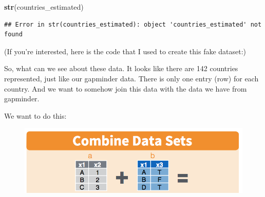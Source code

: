 \documentclass[]{book}
\newenvironment{Shaded}{\begin{snugshade}}{\end{snugshade}}
\newcommand{\KeywordTok}[1]{\textcolor[rgb]{0.13,0.29,0.53}{\textbf{#1}}}
\newcommand{\DataTypeTok}[1]{\textcolor[rgb]{0.13,0.29,0.53}{#1}}
\newcommand{\DecValTok}[1]{\textcolor[rgb]{0.00,0.00,0.81}{#1}}
\newcommand{\StringTok}[1]{\textcolor[rgb]{0.31,0.60,0.02}{#1}}
\newcommand{\OperatorTok}[1]{\textcolor[rgb]{0.81,0.36,0.00}{\textbf{#1}}}
\newcommand{\NormalTok}[1]{#1}
\theoremstyle{definition}
\theoremstyle{definition}
\theoremstyle{definition}
\theoremstyle{remark}
\begin{document}
\begin{Shaded}
\begin{Highlighting}[]
\KeywordTok{str}\NormalTok{(countries_estimated)}
\end{Highlighting}
\end{Shaded}

\begin{verbatim}
## Error in str(countries_estimated): object 'countries_estimated' not found
\end{verbatim}

(If you're interested, here is the code that I used to create this fake
dataset:)

\begin{Shaded}
\end{Shaded}

So, what can we see about these data. It looks like there are 142
countries represented, just like our gapminder data. There is only one
entry (row) for each country. And we want to somehow join this data with
the data we have from gapminder.

We want to do this:

\begin{figure}
\centering
\includegraphics{img/rstudio-cheatsheet-combine.png}
\caption{}
\end{figure}
\end{document}
